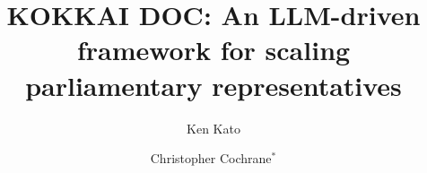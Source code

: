 \documentclass[final,5p,times,twocolumn,authoryear]{elsarticle}
\begin{document}
\begin{frontmatter}

	
	
	\title{KOKKAI DOC: An LLM-driven framework for scaling parliamentary representatives}
	
	
	\author[first]{Ken Kato}
	\author[third]{Christopher Cochrane$^*$}
	
	
	\begin{abstract}
	

\end{abstract}
\end{frontmatter}
\end{document}
